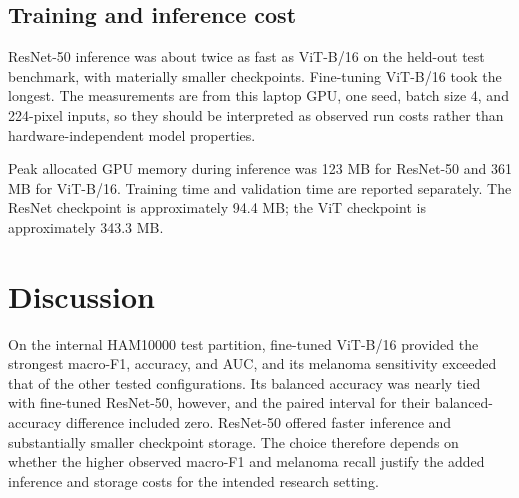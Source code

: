 \documentclass[11pt]{article}
\begin{document}
\subsection{Training and inference cost}

ResNet-50 inference was about twice as fast as ViT-B/16 on the held-out test benchmark, with materially smaller checkpoints. Fine-tuning ViT-B/16 took the longest. The measurements are from this laptop GPU, one seed, batch size 4, and 224-pixel inputs, so they should be interpreted as observed run costs rather than hardware-independent model properties.

\begin{table}[H]
\centering
\scriptsize
\caption{Observed resource use. Test latency and throughput are measured on the HAM10000 test benchmark.}
\label{tab:compute}
\end{table}

Peak allocated GPU memory during inference was 123 MB for ResNet-50 and 361 MB for ViT-B/16. Training time and validation time are reported separately. The ResNet checkpoint is approximately 94.4 MB; the ViT checkpoint is approximately 343.3 MB.

\section{Discussion}

On the internal HAM10000 test partition, fine-tuned ViT-B/16 provided the strongest macro-F1, accuracy, and AUC, and its melanoma sensitivity exceeded that of the other tested configurations. Its balanced accuracy was nearly tied with fine-tuned ResNet-50, however, and the paired interval for their balanced-accuracy difference included zero. ResNet-50 offered faster inference and substantially smaller checkpoint storage. The choice therefore depends on whether the higher observed macro-F1 and melanoma recall justify the added inference and storage costs for the intended research setting.
\end{document}
